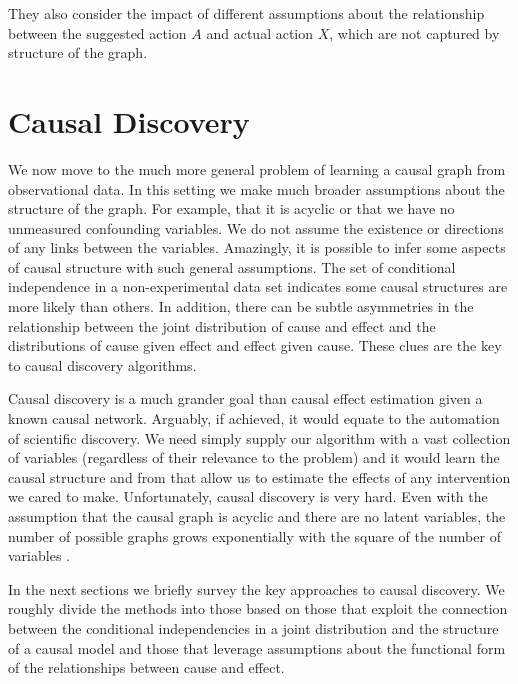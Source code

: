 They also consider the impact of different assumptions about the relationship between the suggested action $A$ and actual action $X$, which are not captured by structure of the graph.

\section{Causal Discovery}
\label{sec:causal-discovery}


We now move to the much more general problem of learning a causal graph from observational data. In this setting we make much broader assumptions about the structure of the graph. For example, that it is acyclic or that we have no unmeasured confounding variables. We do not assume the existence or directions of any links between the variables. Amazingly, it is possible to infer some aspects of causal structure with such general assumptions. The set of conditional independence in a non-experimental data set indicates some causal structures are more likely than others. In addition, there can be subtle asymmetries in the relationship between the joint distribution of cause and effect and the distributions of cause given effect and effect given cause. These clues are the key to causal discovery algorithms.


Causal discovery is a much grander goal than causal effect estimation given a known causal network. Arguably, if achieved, it would equate to the automation of scientific discovery. We need simply supply our algorithm with a vast collection of variables (regardless of their relevance to the problem) and it would learn the causal structure and from that allow us to estimate the effects of any intervention we cared to make. Unfortunately, causal discovery is very hard. Even with the assumption that the causal graph is acyclic and there are no latent variables, the number of possible graphs grows exponentially with the square of the number of variables .


In the next sections we briefly survey the key approaches to causal discovery. We roughly divide the methods into those based on those that exploit the connection between the conditional independencies in a joint distribution and the structure of a causal model and those that leverage assumptions about the functional form of the relationships between cause and effect. 

